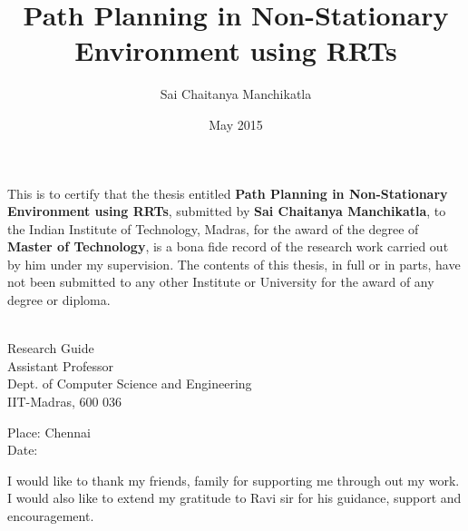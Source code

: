 \documentclass[MTech]{iitmdiss}
\def\thesistitle{Path Planning in Non-Stationary Environment using RRTs}
\def\thesisauthor{Sai Chaitanya Manchikatla}
\begin{document}


\title{\thesistitle}

\author{\thesisauthor}

\date{May 2015}

\begin{singlespace}
\maketitle 
\end{singlespace} 

\certificate

\vspace*{0.5in}

\noindent This is to certify that the thesis entitled {\bf {\thesistitle}}, 
submitted by {\bf {\thesisauthor}}, to the Indian Institute of Technology, 
Madras, for the award of the degree of {\bf Master of Technology}, 
is a bona fide record of the research work carried out by him under my
supervision. The contents of this thesis, in full or in parts, have not been
submitted to any other Institute or University for the award of any degree or
diploma.

\vspace*{1.4in}
\hspace*{-0.25in}
\begin{singlespace}
 \\
\noindent Research Guide \\ 
\noindent Assistant Professor \\
\noindent Dept. of Computer Science and Engineering\\
\noindent IIT-Madras, 600 036 \\
\end{singlespace}
\vspace*{0.20in}
\noindent Place: Chennai\\ 
Date:

\acknowledgements
I would like to thank my friends, family for supporting me through out my work. I would also like to extend my gratitude to Ravi sir for his guidance, support and encouragement. 
\end{document}

